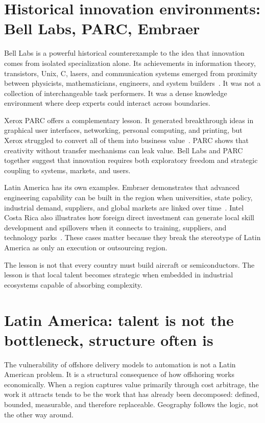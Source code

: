 \documentclass[11pt,a4paper]{article}
\begin{document}
\section{Historical innovation environments: Bell Labs, PARC, Embraer}
Bell Labs is a powerful historical counterexample to the idea that innovation comes from isolated specialization alone. Its achievements in information theory, transistors, Unix, C, lasers, and communication systems emerged from proximity between physicists, mathematicians, engineers, and system builders \,\citep{gertner2012idea}. It was not a collection of interchangeable task performers. It was a dense knowledge environment where deep experts could interact across boundaries.

Xerox PARC offers a complementary lesson. It generated breakthrough ideas in graphical user interfaces, networking, personal computing, and printing, but Xerox struggled to convert all of them into business value \,\citep{hiltzik1999dealers}. PARC shows that creativity without transfer mechanisms can leak value. Bell Labs and PARC together suggest that innovation requires both exploratory freedom and strategic coupling to systems, markets, and users.

Latin America has its own examples. Embraer demonstrates that advanced engineering capability can be built in the region when universities, state policy, industrial demand, suppliers, and global markets are linked over time \,\citep{bernardes2003embraer,mcmanus2024innovation}. Intel Costa Rica also illustrates how foreign direct investment can generate local skill development and spillovers when it connects to training, suppliers, and technology parks \,\citep{worldbank2006intel,oecd_2024_fdi_lac}. These cases matter because they break the stereotype of Latin America as only an execution or outsourcing region.

The lesson is not that every country must build aircraft or semiconductors. The lesson is that local talent becomes strategic when embedded in industrial ecosystems capable of absorbing complexity.


\section{Latin America: talent is not the bottleneck, structure often is}
The vulnerability of offshore delivery models to automation is not a Latin American problem. It is a structural consequence of how offshoring works economically. When a region captures value primarily through cost arbitrage, the work it attracts tends to be the work that has already been decomposed: defined, bounded, measurable, and therefore replaceable. Geography follows the logic, not the other way around.
\end{document}
